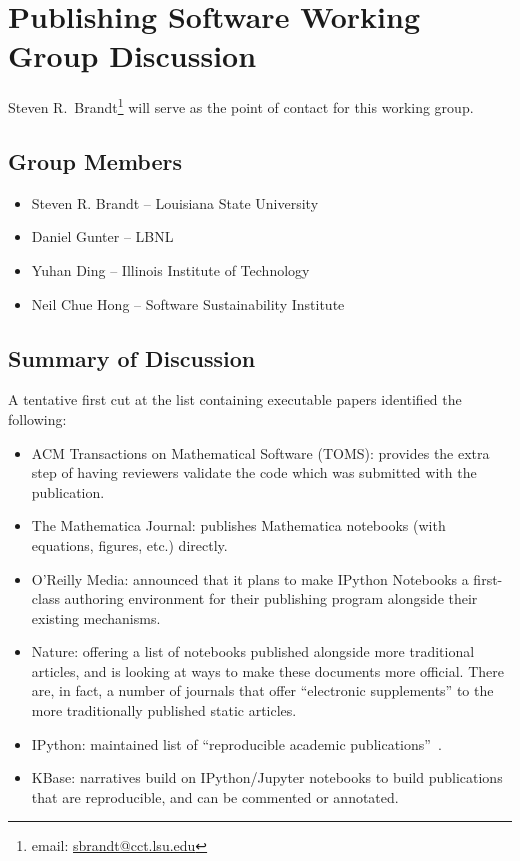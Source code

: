 \section{Publishing Software Working Group Discussion}
\label{sec:appendix_publishing_SW}

Steven R.\ Brandt\footnote{email: \href{mailto:sbrandt@cct.lsu.edu}{sbrandt@cct.lsu.edu}} will serve as the point of contact for this working group.

\subsection{Group Members}

\begin{itemize}
\item Steven R. Brandt -- Louisiana State University
\item Daniel Gunter -- LBNL
\item Yuhan Ding -- Illinois Institute of Technology
\item Neil Chue Hong -- Software Sustainability Institute
\end{itemize}

\subsection{Summary of Discussion}

A tentative first cut at the list containing executable papers identified the following:
\begin{itemize}
\item ACM Transactions on Mathematical Software (TOMS): provides the extra step
 of having reviewers validate the code which was submitted with the publication.
\item The Mathematica Journal: publishes Mathematica notebooks (with equations,
figures, etc.) directly.
\item O'Reilly Media: announced that it plans to make IPython Notebooks a first-class
 authoring environment for their publishing program alongside their existing mechanisms.
\item Nature: offering a list of notebooks published alongside more traditional articles,
 and is looking at ways to make these documents more official. There are, in fact, a
 number of journals that offer ``electronic supplements'' to the more traditionally published
 static articles.
\item IPython: maintained list of ``reproducible academic publications''~\cite{ipython-pubs}.
\item KBase: narratives build on IPython\slash Jupyter notebooks to build publications that are
  reproducible, and can be commented or annotated.
\end{itemize}

